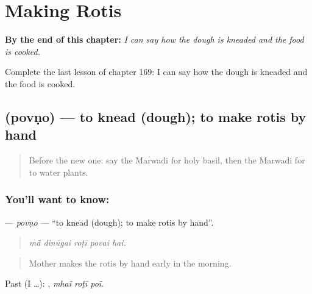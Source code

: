 
\chapter{Making Rotis}
\label{ch:mw-making-rotis}

\begin{chapteropening}
\textbf{By the end of this chapter:} \emph{I can say how the dough is kneaded and the food is cooked.}

Complete the last lesson of chapter 169: I can say how the dough is kneaded and the food is cooked.
\end{chapteropening}

\section[\texorpdfstring{\mw{पोवणो} (povṇo)}{पोवणो (povṇo)}]{ (povṇo) — to knead (dough); to make rotis by hand}

\label{lesson:MW-C169-povno}



\begin{quote}
Before the new one: say the Marwadi for holy basil, then the Marwadi for to water plants.
\end{quote}

\subsection*{You'll want to know: }
\textbf{} — \emph{povṇo} — \textquotedblleft{}to knead (dough); to make rotis by hand\textquotedblright{}.

\begin{quote}
    
\end{quote}

\begin{quote}
\emph{mā̃ dinūgai roṭī povai hai.}
\end{quote}

\begin{quote}
Mother makes the rotis by hand early in the morning.
\end{quote}

Past (I …):   , \emph{mhaĩ roṭī poī}.

